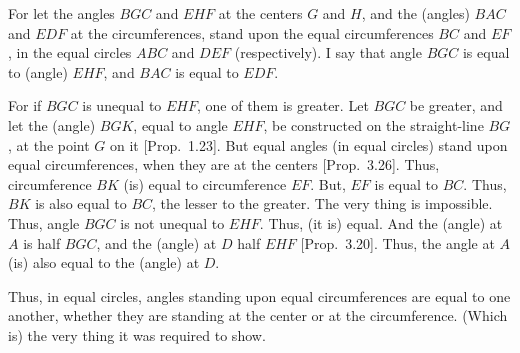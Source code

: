 \begin{Parallel}{}{}
{For let the angles $BGC$ and $EHF$ at the centers $G$ and $H$, and the (angles) $BAC$ and $EDF$
at the circumferences, stand upon the equal circumferences $BC$ and $EF$, in the equal circles $ABC$ and $DEF$ (respectively). I say that angle $BGC$ is
equal to (angle) $EHF$, and $BAC$ is equal to $EDF$.

For if $BGC$ is unequal to $EHF$, one of them is greater. Let $BGC$ be greater, 
and let the (angle) $BGK$, equal to  angle $EHF$, be constructed on the
straight-line $BG$, at the point $G$ on it [Prop.~1.23]. But equal angles (in equal circles) stand upon equal circumferences, when they are at the centers [Prop.~3.26]. Thus,
circumference $BK$ (is) equal to circumference $EF$. But, $EF$ is equal to $BC$.
Thus, $BK$ is also equal to $BC$, the lesser to the greater. The very thing is
impossible. Thus, angle $BGC$ is not unequal to $EHF$. Thus, (it is) equal.
And the (angle) at $A$ is half $BGC$, and the (angle) at $D$ half $EHF$ [Prop.~3.20]. Thus, the angle at $A$ (is) also equal to the (angle) at $D$.

Thus, in equal circles, angles standing upon equal circumferences  are equal to one
another, whether they are standing at the center or at the circumference.
(Which is) the very thing it was required to show.\\}
\end{Parallel}

